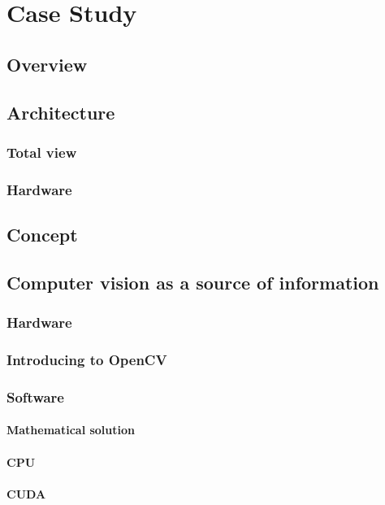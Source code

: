 \chapter{Case Study}
\label{chap:case_study}

\section{Overview}

\section{Architecture}
	\subsection{Total view}
	\subsection{Hardware}

\section{Concept}

\section{Computer vision as a source of information}
	\subsection{Hardware}
	\subsection{Introducing to OpenCV}
	\subsection{Software}
		\subsubsection{Mathematical solution}
		\subsubsection{CPU}
		\subsubsection{CUDA}

